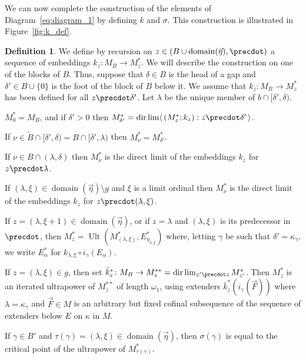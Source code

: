 \documentclass[
twoside,
]{article}
\theoremstyle{definition}
\newtheorem{definition}[theorem]{Definition}
\theoremstyle{remark}
\newcommand{\sing}[1]{\{#1\}}
\newcommand{\pair}[1]{\langle#1\rangle}
\newcommand{\seq}[1]{\pair{\,#1\,}}
\DeclareMathOperator{\ult}{Ult}
\DeclareMathOperator{\domain}{domain}
\DeclareMathOperator{\dirlim}{dir\,lim}
\begin{document}
We can now complete the construction of the elements of
Diagram~\eqref{eq:diagram_1} by defining $k$ and $\sigma$.    This
construction is illustrated in Figure~\ref{fig:k_def}.

\begin{definition}
  \label{def:k}
  We define by recursion on $z\in (B\cup\domain(\vec\eta),\precdot)$
  a sequence of embeddings         $k_{z}\colon M_{B}\to M^*_{z}$.  
  We will describe the construction on one of the blocks of $B$. 
  Thus, suppose that $\delta\in B$ is the head of a gap and
  $\delta'\in B\cup\sing{0}$ is the foot of the block of $B$ below it.
  We assume that $k_z\colon M_B\to M^*_z$ has been defined for all $z\precdot\delta'$. 
  Let $\lambda$ be the unique member of $b\cap[\delta',\delta)$.     
  \begin{compactenum}[(i)] 
  \item 
    $M^*_0=M_B$, and if $\delta'>0$ then 
    $M^*_{\delta'}=\dirlim\seq{(M_z^*;k_z):z\precdot \delta'}$.
  \item If $\nu\in \tilde B\cap
    [\delta',\delta)=B\cap[\delta',\lambda)$ then
    $M^*_\nu=M^*_{\delta'}$. 
  \item If $\nu\in B\cap(\lambda,\delta)$ then
    $M^*_\nu$  is the
    direct limit of the embeddings $k_z$ for $z\precdot
    \lambda$. 
  \item If $(\lambda,\xi)\in \domain(\vec\eta)\setminus g$ and
    $\xi$ is a limit ordinal then
    $M^*_\nu$ is the direct limit of the embeddings $k_z$ for
    $z\precdot(\lambda,\xi)$.  
  \item If $z=(\lambda,\xi+1)\in \domain(\vec\eta)$, or if
    $z=\lambda$ and $(\lambda,\xi)$ is its predecessor in
    $\precdot$, then $M^*_z=\ult(M^*_{(\lambda,\xi)}, 
    E^*_{\eta_{\lambda,\xi}})$ where, letting $\gamma$ be such that
    $\delta'=\kappa_{\gamma}$, we write $E^*_{\alpha}$ for
    $k_{\lambda,\xi}\circ i_{\gamma}(E_\alpha)$.
  \item If $z=(\lambda,\xi)\in g$, then set $\bar k^*_z\colon M_B\to
    M^{**}_z=\dirlim_{z'\precdot z}M^*_{z'}$.
    Then $M^*_z$ 
    is an iterated ultrapower of $M^{**}_z$
    of length $\omega_1$, using extenders $\bar k^{*}_z(i_{\gamma}(\vec
    F))$ where $\lambda=\kappa_{\gamma}$ and $\vec F\in M$ is an
    arbitrary but fixed cofinal subsequence of the 
    sequence of extenders below $E$ on $\kappa$ in $M$.
  \end{compactenum}
  If $\gamma\in B'$ and $\tau(\gamma)=(\lambda,\xi)\in \domain(\vec\eta)$, then
  $\sigma(\gamma)$ is equal to  the critical point of the ultrapower of 
  $M^*_{\tau(\gamma)}$.
\end{definition}
\end{document}
